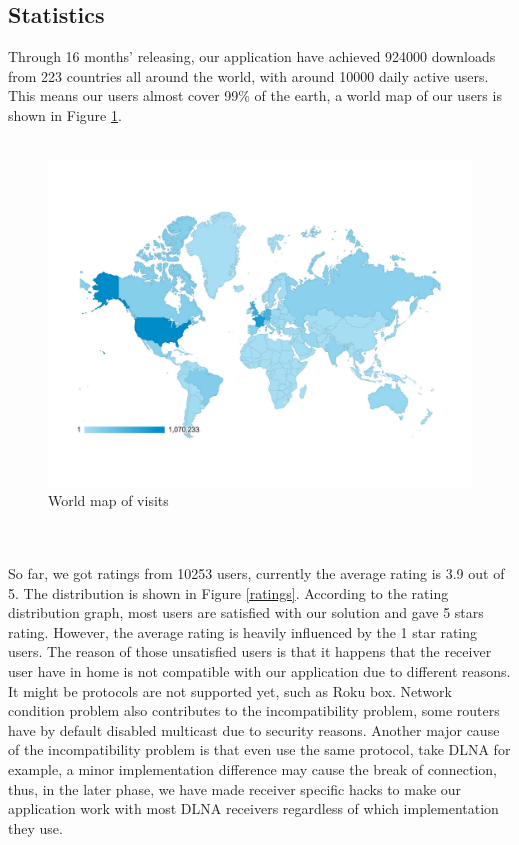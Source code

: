 \subsection{Statistics}
Through 16 months' releasing, our application have achieved 924000 downloads from 223 countries all around the world, with around 10000 daily active users. This means our users almost cover 99\% of the earth, a world map of our users is shown in Figure \ref{user_map}. \\
\\
\begin{figure}[htb]
\centering \includegraphics[width=14cm]{charts/session_world_map}
\caption{World map of visits \label{user_map}}
\end{figure}\\
\\
So far, we got ratings from 10253 users, currently the average rating is 3.9 out of 5. The distribution is shown in Figure \ref{ratings}. According to the rating distribution graph, most users are satisfied with our solution and gave 5 stars rating. However, the average rating is heavily influenced by the 1 star rating users. The reason of those unsatisfied users is that it happens that the receiver user have in home is not compatible with our application due to different reasons. It might be protocols are not supported yet, such as Roku box. Network condition problem also contributes to the incompatibility problem, some routers have by default disabled multicast due to security reasons. Another major cause of the incompatibility problem is that even use the same protocol, take DLNA for example, a minor implementation difference may cause the break of connection, thus, in the later phase, we have made receiver specific hacks to make our application work with most DLNA receivers regardless of which implementation they use.\\
